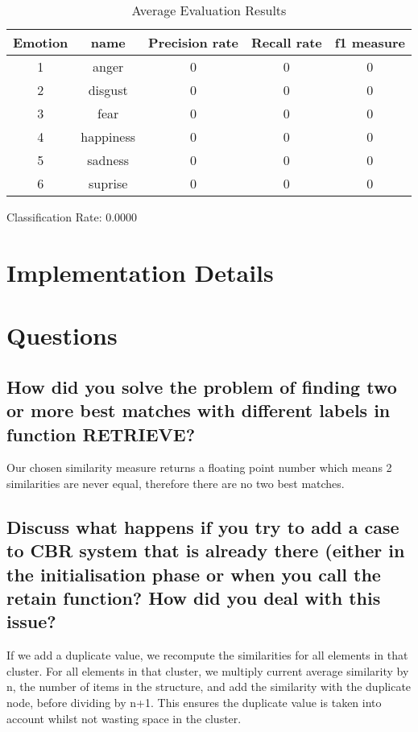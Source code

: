 \documentclass[11pt]{article}
\begin{document}
\begin{table}[H]
\caption{Average Evaluation Results} %
\centering %
\begin{tabular}{c c c c c} %
\hline\hline %
Emotion & name & Precision rate & Recall rate & f1 measure\\ [0.5ex] %
\hline %
1 & anger     & 0 & 0 & 0\\ %
2 & disgust   & 0 & 0 & 0\\
3 & fear      & 0 & 0 & 0\\
4 & happiness & 0 & 0 & 0\\
5 & sadness   & 0 & 0 & 0\\ 
6 & suprise   & 0 & 0 & 0\\ [1ex] %
\hline %
\end{tabular}
\label{table:sixevaluation} %
\end{table}

Classification Rate: 0.0000


\section{Implementation Details}
\section{Questions}

\subsection{How did you solve the problem of finding two or more best matches with different labels in function RETRIEVE?}

Our chosen similarity measure returns a floating point number which means 2 similarities are 
never equal, therefore there are no two best matches.

\subsection{Discuss what happens if you try to add a case to CBR system that is already there (either in the initialisation phase or when you call the retain function? How did you deal with this issue?}

If we add a duplicate value, we recompute the similarities for all elements in that cluster.
For all elements in that cluster, we multiply current average similarity by n, 
the number of items in the structure, and add
the similarity with the duplicate node, before dividing by n+1. This ensures the duplicate
value is taken into account whilst not wasting space in the cluster.
\end{document}
